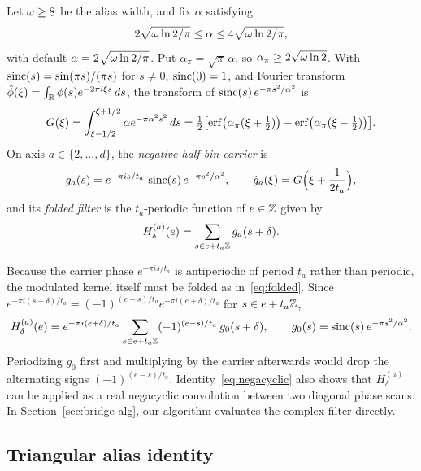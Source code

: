 \begin{definition}\label{def:carrier}
Let $\omega\ge 8$ be the alias width, and fix $\alpha$ satisfying
\begin{equation}\label{eq:alpha}
  2\sqrt{\omega\ln 2/\pi}\le\alpha\le 4\sqrt{\omega\ln 2/\pi},
\end{equation}
with default $\alpha=2\sqrt{\omega\ln 2/\pi}$. Put $\alpha_\pi=\sqrt\pi\,\alpha$, so $\alpha_\pi\ge 2\sqrt{\omega\ln 2}$. With
$\operatorname{sinc}(s)=\sin(\pi s)/(\pi s)$ for $s\ne 0$, $\operatorname{sinc}(0)=1$, and Fourier transform $\hat\phi(\xi)=\int_{\mathbb{R}}\phi(s)e^{-2\pi i\xi s}\,ds$,
the transform of $\operatorname{sinc}(s)\,e^{-\pi s^2/\alpha^2}$ is
\begin{equation}\label{eq:G}
  G(\xi)=\int_{\xi-1/2}^{\xi+1/2}\alpha e^{-\pi\alpha^2 s^2}\,ds
  =\tfrac12\bigl[\operatorname{erf}\bigl(\alpha_\pi(\xi+\tfrac12)\bigr)-\operatorname{erf}\bigl(\alpha_\pi(\xi-\tfrac12)\bigr)\bigr].
\end{equation}
On axis $a\in\{2,\dots,d\}$, the \emph{negative half-bin carrier} is
\begin{equation}\label{eq:carrier}
  g_a(s)=e^{-\pi i s/t_a}\,\operatorname{sinc}(s)\,e^{-\pi s^2/\alpha^2},\qquad
  \hat g_a(\xi)=G\Bigl(\xi+\frac{1}{2t_a}\Bigr),
\end{equation}
and its \emph{folded filter} is the $t_a$-periodic function of $e\in\mathbb{Z}$ given by
\begin{equation}\label{eq:folded}
  H^{(a)}_\delta(e)=\sum_{s\in e+t_a\mathbb{Z}}g_a(s+\delta).
\end{equation}
\end{definition}

Because the carrier phase $e^{-\pi i s/t_a}$ is antiperiodic of period $t_a$ rather than periodic, the modulated kernel
itself must be folded as in~\eqref{eq:folded}. Since $e^{-\pi i(s+\delta)/t_a}=(-1)^{(e-s)/t_a}e^{-\pi i(e+\delta)/t_a}$
for $s\in e+t_a\mathbb{Z}$,
\begin{equation}\label{eq:negacyclic}
  H^{(a)}_\delta(e)=e^{-\pi i(e+\delta)/t_a}\sum_{s\in e+t_a\mathbb{Z}}(-1)^{(e-s)/t_a}\,g_0(s+\delta),\qquad
  g_0(s)=\operatorname{sinc}(s)\,e^{-\pi s^2/\alpha^2}.
\end{equation}
Periodizing $g_0$ first and multiplying by the carrier afterwards would drop the alternating signs $(-1)^{(e-s)/t_a}$.
Identity~\eqref{eq:negacyclic} also shows that $H^{(a)}_\delta$ can be applied as a real negacyclic convolution between
two diagonal phase scans. In Section~\ref{sec:bridge-alg}, our algorithm evaluates the complex filter directly.

\subsection{Triangular alias identity}\label{sec:bridge-A}

